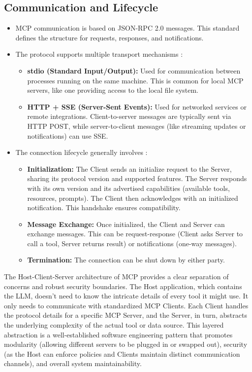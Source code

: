 \subsection*{Communication and Lifecycle}
\begin{itemize}
    \item MCP communication is based on JSON-RPC 2.0 messages. This standard defines the structure for requests, responses, and notifications.
    \item The protocol supports multiple transport mechanisms :
    \begin{itemize}
        \item \textbf{stdio (Standard Input/Output):} Used for communication between processes running on the same machine. 
        This is common for local MCP servers, like one providing access to the local file system.
        \item \textbf{HTTP + SSE (Server-Sent Events):} Used for networked services or remote integrations. 
        Client-to-server messages are typically sent via HTTP POST, while server-to-client messages (like streaming updates or notifications) can use SSE.
    \end{itemize}
    \item The connection lifecycle generally involves :
    \begin{itemize}
        \item \textbf{Initialization:} The Client sends an initialize request to the Server, sharing its protocol version and supported features. 
        The Server responds with its own version and its advertised capabilities (available tools, resources, prompts). 
        The Client then acknowledges with an initialized notification. This handshake ensures compatibility.
        \item \textbf{Message Exchange:} Once initialized, the Client and Server can exchange messages. This can be request-response 
        (Client asks Server to call a tool, Server returns result) or notifications (one-way messages).
        \item \textbf{Termination:} The connection can be shut down by either party.
    \end{itemize}
\end{itemize}

The Host-Client-Server architecture of MCP provides a clear separation of concerns and robust security boundaries. 
The Host application, which contains the LLM, doesn't need to know the intricate details of every tool it might use. 
It only needs to communicate with standardized MCP Clients. Each Client handles the protocol details for a specific MCP Server, 
and the Server, in turn, abstracts the underlying complexity of the actual tool or data source. This layered abstraction is a 
well-established software engineering pattern that promotes modularity (allowing different servers to be plugged in or swapped out),
 security (as the Host can enforce policies and Clients maintain distinct communication channels), and overall system maintainability.

